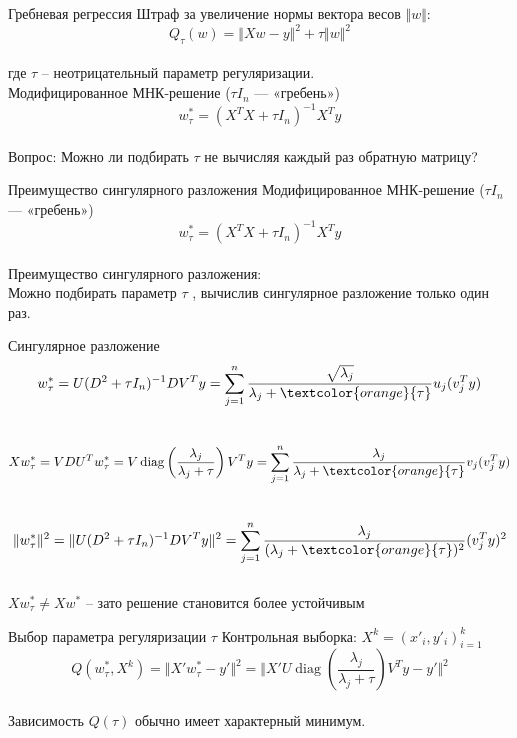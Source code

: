 \documentclass[10pt]{beamer}
\begin{document}
{
\begin{frame}{Гребневая регрессия}
	Штраф за увеличение нормы вектора весов $\Vert w \Vert$:\\
	$$Q_{\tau} (w) = \Vert X w - y \Vert^2 + \tau \Vert w \Vert^2$$\\
	где $\tau$ -- неотрицательный параметр регуляризации.\\
  \pause
	\bigbreak
	Модифицированное МНК-решение ($\tau I_n$ — «гребень»)\\
	$$w^*_{\tau} = (X^T X + \tau I_n)^{-1}X^Ty$$\\
  \pause	
  \bigbreak
	\alert{Вопрос:} Можно ли подбирать $\tau$ не вычисляя каждый раз обратную матрицу?
\end{frame}
}

\begin{frame}{Преимущество сингулярного разложения}
	Модифицированное МНК-решение ($\tau I_n$ — «гребень»)\\
	$$w^*_{\tau} = (X^TX + \tau I_n)^{-1}X^Ty$$\\
	\pause
	\bigbreak
	Преимущество сингулярного разложения:\\
	Можно подбирать параметр $\tau$ , вычислив сингулярное разложение только один раз.
\end{frame}

\begin{frame}{Сингулярное разложение}
	$$w_{\tau}^*= U(D^2 + \tau I_n)^{-1}DV^Ty = \sum\limits_{j=1}^n \frac{\sqrt{\lambda_j}}{\lambda_j + \textcolor{orange}{\tau}} u_j(v_j^Ty)$$\\
	\pause
	$$Xw_{\tau}^* = VDU^Tw_{\tau}^* = V \operatorname{diag} \left(\frac{\lambda_j}{\lambda_j + \tau}\right) V^Ty = \sum\limits_{j=1}^n \frac{\lambda_j}{\lambda_j + \textcolor{orange}{\tau}} v_j (v_j^Ty)$$\\
	\pause
	$$\Vert w_{\tau}^* \Vert^2 = \Vert U (D^2 + \tau I_n)^{-1} DV^T y \Vert^2 = \sum\limits_{j=1}^n \frac{\lambda_j}{(\lambda_j + \textcolor{orange}{\tau})^2} (v^T_j y)^2$$\\
	\pause
	$X w_{\tau}^* \neq Xw^*$ -- зато решение становится более устойчивым
\end{frame}

\begin{frame}{Выбор параметра регуляризации $\tau$}
	Контрольная выборка: $X^k = (x'_i, y'_i)_{i=1}^k$\\
	$$Q(w_{\tau}^*,X^k) = \Vert X' w_{\tau}^* - y' \Vert^2 = \Vert X'U \operatorname{diag} \left(\frac{\lambda_j}{\lambda_j + \tau}\right) V^T y -y' \Vert^2$$\\
	\bigbreak
	\pause
	Зависимость $Q(\tau)$ обычно имеет характерный минимум.
\end{frame}
\end{document}

